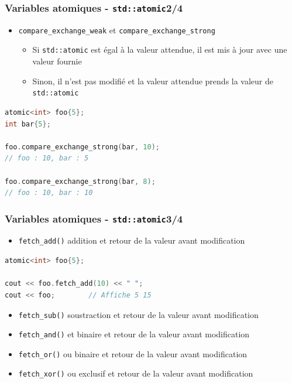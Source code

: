 \documentclass[C++.tex]{subfiles}
\begin{document}
\begin{frame}[fragile]
	\frametitle{Variables atomiques - \lstinline|std::atomic|\titlehfill{}2/4}
	\begin{itemize}
		\item \lstinline|compare_exchange_weak| et \lstinline|compare_exchange_strong| 


		\begin{itemize}
			\item Si \lstinline|std::atomic| est égal à la valeur attendue, il est mis à jour avec une valeur fournie
			\item Sinon, il n'est pas modifié et la valeur attendue prends la valeur de \lstinline|std::atomic|
		\end{itemize}
	\end{itemize}

	\begin{lstlisting}[language=C++]
atomic<int> foo{5};
int bar{5};

foo.compare_exchange_strong(bar, 10);
// foo : 10, bar : 5

foo.compare_exchange_strong(bar, 8);
// foo : 10, bar : 10\end{lstlisting}
\end{frame}

\begin{frame}[fragile]
	\frametitle{Variables atomiques - \lstinline|std::atomic|\titlehfill{}3/4}
	\begin{itemize}
		\item \lstinline|fetch_add()| addition et retour de la valeur avant modification
	\end{itemize}

	\begin{lstlisting}[language=C++]
atomic<int> foo{5};

cout << foo.fetch_add(10) << " ";
cout << foo;        // Affiche 5 15\end{lstlisting}

	\begin{itemize}
		\item \lstinline|fetch_sub()| soustraction et retour de la valeur avant modification
		\item \lstinline|fetch_and()| \og et\fg{} binaire et retour de la valeur avant modification
		\item \lstinline|fetch_or()| \og ou\fg{} binaire et retour de la valeur avant modification
		\item \lstinline|fetch_xor()| \og ou exclusif\fg{} et retour de la valeur avant modification
	\end{itemize}
\end{frame}
\end{document}
